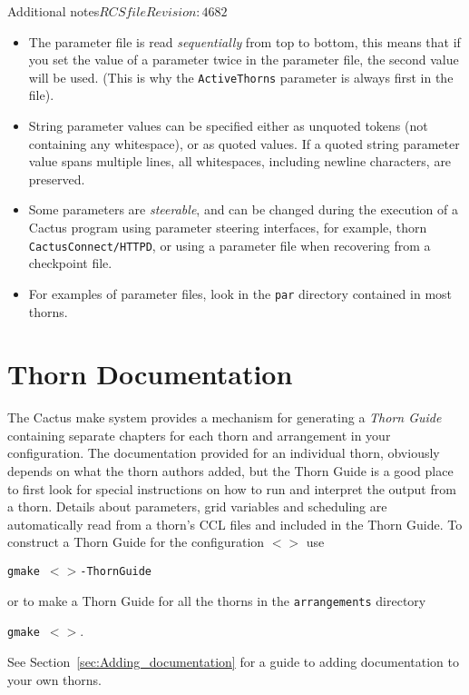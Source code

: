 \begin{cactuspart}{Additional notes}{$RCSfile$}{$Revision: 4682 $}
\begin{itemize}
\item{} The parameter file is read \emph{sequentially} from top to bottom,
        this means that if you set the value of a parameter twice in
        the parameter file, the second value will be used. (This is
        why the \texttt{ActiveThorns} parameter is always first in the file).

\item{} String parameter values can be specified either as unquoted tokens (not
        containing any whitespace), or as quoted values. If a quoted string
        parameter value spans multiple lines, all whitespaces, including newline
        characters, are preserved.

\item{} Some parameters are \textit{steerable}, and can be changed during
        the execution of a Cactus program using parameter steering interfaces,
        for example, thorn \texttt{CactusConnect/HTTPD}, or using a
        parameter file when recovering from a checkpoint file.

\item{} For examples of parameter files, look in the \texttt{par} directory
        contained in most thorns.

\end{itemize}

\section{Thorn Documentation}
\label{sec:thdo}

The Cactus make system provides a mechanism for generating a
\textit{Thorn Guide} containing separate chapters for each thorn and
arrangement in your configuration. The documentation provided for an
individual thorn, obviously depends on what the thorn authors added,
but the Thorn Guide is a good place to first look for special
instructions on how to run and interpret the output from a thorn.
Details about parameters, grid variables and scheduling are
automatically read from a thorn's CCL files and included in the Thorn
Guide. To construct a Thorn Guide for the configuration
\texttt{$<$$>$} use

\texttt{gmake $<$$>$-ThornGuide}

or to make a Thorn Guide for all the thorns in the \texttt{arrangements} directory

\texttt{gmake $<$$>$}.

See Section~\ref{sec:Adding_documentation} for a guide to adding
documentation to your own thorns.



\end{cactuspart}
